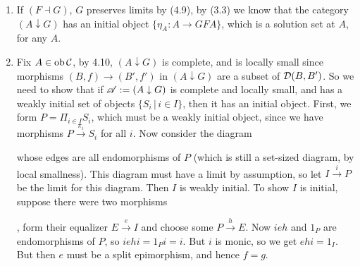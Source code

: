\documentclass{article}
\begin{document}
\begin{enumerate}
    \item[$\Rightarrow$] If $(F \dashv G)$, $G$ preserves limits by (4.9), by (3.3) we know that the category $(A \downarrow G)$ has an initial object $\{\eta_{A} : A \to GFA\}$, which is a solution set at $A$, for any $A$.
    \item[$\Leftarrow$] Fix $A \in \operatorname{ob} \mathcal{C}$, by 4.10, $(A \downarrow G)$ is complete, and is locally small since morphisms $(B,f) \to (B',f')$ in $(A \downarrow G)$ are a subset of $\mathcal{D}(B,B')$. So we need to show that if $\mathscr{A} := (A \downarrow G)$ is complete and locally small, and has a weakly initial set of objects $\{S_{i} \, | \, i \in I\}$, then it has an initial object. \gap First, we form $P = \Pi_{i \in I}S_{i}$, which must be a weakly initial object, since we have morphisms $P \xrightarrow{\pi_{i}} S_{i}$ for all $i$. Now consider the diagram \begin{center}
    \end{center}
    whose edges are all endomorphisms of $P$ (which is still a set-sized diagram, by local smallness). This diagram must have a limit by assumption, so let $I \xrightarrow{i} P$ be the limit for this diagram. Then $I$ is weakly initial. To show $I$ is initial, suppose there were two morphisms 
    , form their equalizer $E \xrightarrow{e} I$ and choose some $P \xrightarrow{h} E$. Now $ieh$ and $1_{P}$ are endomorphisms of $P$, so $iehi = 1_{P}i=i$. But $i$ is monic, so we get $ehi=1_{I}$. But then $e$ must be a split epimorphism, and hence $f=g$.
\end{enumerate}
\endproof
\end{document}
